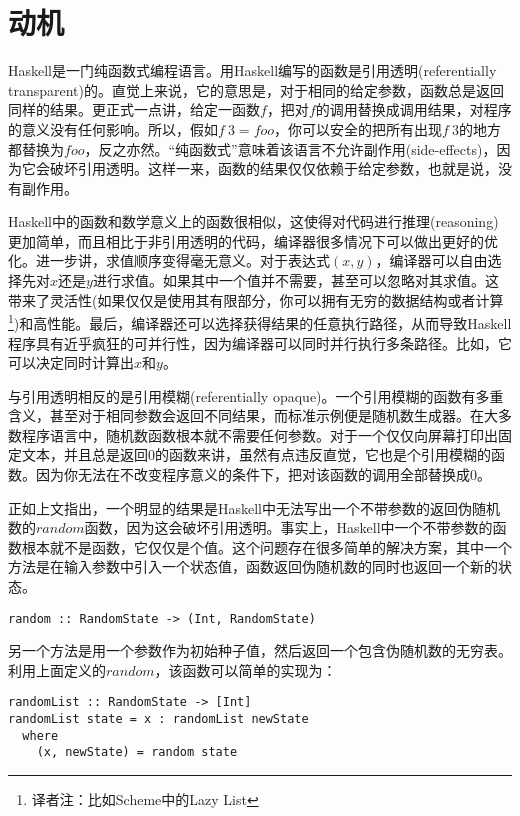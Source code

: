 \section{动机}

Haskell是一门纯函数式编程语言。用Haskell编写的函数是引用透明(referentially transparent)的。直觉上来说，它的意思是，对于相同的给定参数，函数总是返回同样的结果。更正式一点讲，给定一函数$f$，把对$f$的调用替换成调用结果，对程序的意义没有任何影响。所以，假如$f\ 3 = foo$，你可以安全的把所有出现$f\ 3$的地方都替换为$foo$，反之亦然。“纯函数式”意味着该语言不允许副作用(side-effects)，因为它会破坏引用透明。这样一来，函数的结果仅仅依赖于给定参数，也就是说，没有副作用。

Haskell中的函数和数学意义上的函数很相似，这使得对代码进行推理(reasoning)更加简单，而且相比于非引用透明的代码，编译器很多情况下可以做出更好的优化。进一步讲，求值顺序变得毫无意义。对于表达式$(x,y)$，编译器可以自由选择先对$x$还是$y$进行求值。如果其中一个值并不需要，甚至可以忽略对其求值。这带来了灵活性(如果仅仅是使用其有限部分，你可以拥有无穷的数据结构或者计算\footnote{译者注：比如Scheme中的Lazy List})和高性能。最后，编译器还可以选择获得结果的任意执行路径，从而导致Haskell程序具有近乎疯狂的可并行性，因为编译器可以同时并行执行多条路径。比如，它可以决定同时计算出$x$和$y$。

与引用透明相反的是引用模糊(referentially opaque)。一个引用模糊的函数有多重含义，甚至对于相同参数会返回不同结果，而标准示例便是随机数生成器。在大多数程序语言中，随机数函数根本就不需要任何参数。对于一个仅仅向屏幕打印出固定文本，并且总是返回$0$的函数来讲，虽然有点违反直觉，它也是个引用模糊的函数。因为你无法在不改变程序意义的条件下，把对该函数的调用全部替换成$0$。

正如上文指出，一个明显的结果是Haskell中无法写出一个不带参数的返回伪随机数的$random$函数，因为这会破坏引用透明。事实上，Haskell中一个不带参数的函数根本就不是函数，它仅仅是个值。这个问题存在很多简单的解决方案，其中一个方法是在输入参数中引入一个状态值，函数返回伪随机数的同时也返回一个新的状态。

\begin{lstlisting}
random :: RandomState -> (Int, RandomState)
\end{lstlisting}

另一个方法是用一个参数作为初始种子值，然后返回一个包含伪随机数的无穷表。利用上面定义的$random$，该函数可以简单的实现为：

\begin{lstlisting}
randomList :: RandomState -> [Int]
randomList state = x : randomList newState
  where
    (x, newState) = random state
\end{lstlisting}

